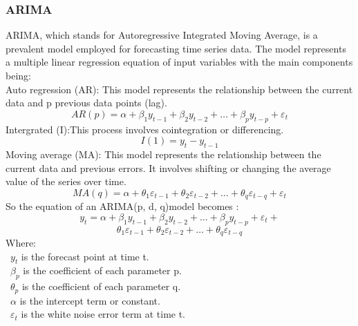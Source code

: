 \documentclass{ieeeojies}
\begin{document}
\subsubsection{ARIMA}
ARIMA, which stands for Autoregressive Integrated Moving Average, is a prevalent model employed for forecasting time series data. The model represents a multiple linear regression equation of input variables with the main components being:\\
Auto regression (AR): This model represents the relationship between the current data and p previous data points (lag). 
\[AR(p) = \alpha + \beta_1 y_{t-1} + \beta_2 y_{t-2} + \dots + \beta_p y_{t-p} + \varepsilon_t\]
Intergrated (I):This process involves cointegration or differencing.
\[I(1) = y_t - y_{t-1}\]
Moving average (MA): This model represents the relationship between the current data and previous errors. It involves shifting or changing the average value of the series over time.
\[MA(q) = \alpha + \theta_1 \varepsilon_{t-1} + \theta_2 \varepsilon_{t-2} + \dots + \theta_q \varepsilon_{t-q} + \varepsilon_t\]
So the equation of an ARIMA(p, d, q)model becomes :
\[y_t = \alpha + \beta_1 y_{t-1} + \beta_2 y_{t-2} + \dots + \beta_p y_{t-p} + \varepsilon_t + \]
\[\theta_1 \varepsilon_{t-1} + \theta_2 \varepsilon_{t-2} + \dots + \theta_q \varepsilon_{t-q}\]
Where:\\
	\indent\textbullet\ \(y_t\) is the forecast point at time t.\\
        \indent\textbullet\ \(\beta_p\) is the coefficient of each parameter p.\\
	\indent\textbullet\ \(\theta_p\) is the coefficient of each parameter q.\\
	\indent\textbullet\ \(\alpha\) is the intercept term or constant.\\
	\indent\textbullet\ \(\varepsilon_t\) is the white noise error term at time t.
\end{document}
